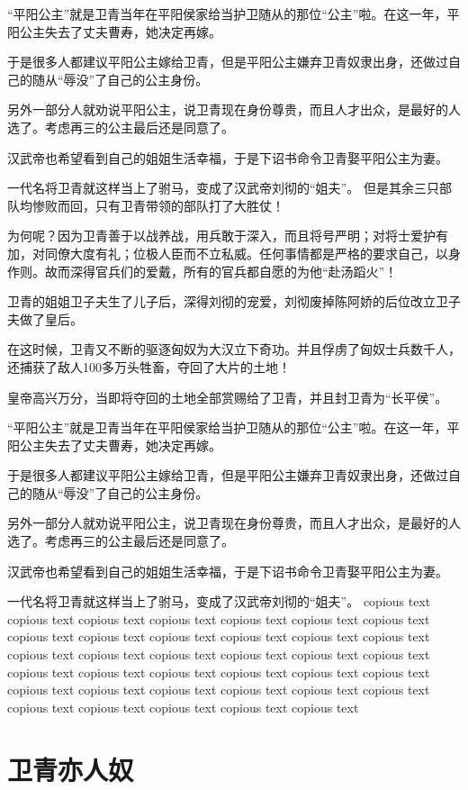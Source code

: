 \documentclass[UTF8,cap,nofonts,openany,twoside]{ctexbook}
\begin{document}
“平阳公主”就是卫青当年在平阳侯家给当护卫随从的那位“公主”啦。在这一年，平阳公主失去了丈夫曹寿，她决定再嫁。

于是很多人都建议平阳公主嫁给卫青，但是平阳公主嫌弃卫青奴隶出身，还做过自己的随从“辱没”了自己的公主身份。

另外一部分人就劝说平阳公主，说卫青现在身份尊贵，而且人才出众，是最好的人选了。考虑再三的公主最后还是同意了。

汉武帝也希望看到自己的姐姐生活幸福，于是下诏书命令卫青娶平阳公主为妻。

一代名将卫青就这样当上了驸马，变成了汉武帝刘彻的“姐夫”。
\newpage
但是其余三只部队均惨败而回，只有卫青带领的部队打了大胜仗！

为何呢？因为卫青善于以战养战，用兵敢于深入，而且将号严明；对将士爱护有加，对同僚大度有礼；位极人臣而不立私威。任何事情都是严格的要求自己，以身作则。故而深得官兵们的爱戴，所有的官兵都自愿的为他“赴汤蹈火”！

卫青的姐姐卫子夫生了儿子后，深得刘彻的宠爱，刘彻废掉陈阿娇的后位改立卫子夫做了皇后。

在这时候，卫青又不断的驱逐匈奴为大汉立下奇功。并且俘虏了匈奴士兵数千人，还捕获了敌人100多万头牲畜，夺回了大片的土地！

皇帝高兴万分，当即将夺回的土地全部赏赐给了卫青，并且封卫青为“长平侯”。

“平阳公主”就是卫青当年在平阳侯家给当护卫随从的那位“公主”啦。在这一年，平阳公主失去了丈夫曹寿，她决定再嫁。

于是很多人都建议平阳公主嫁给卫青，但是平阳公主嫌弃卫青奴隶出身，还做过自己的随从“辱没”了自己的公主身份。

另外一部分人就劝说平阳公主，说卫青现在身份尊贵，而且人才出众，是最好的人选了。考虑再三的公主最后还是同意了。

汉武帝也希望看到自己的姐姐生活幸福，于是下诏书命令卫青娶平阳公主为妻。

一代名将卫青就这样当上了驸马，变成了汉武帝刘彻的“姐夫”。
\setcounter{page}{10}
\noindent copious text copious text copious text copious text copious text copious text copious text copious text copious text copious text copious text copious text copious text copious text copious text copious text copious text copious text copious text copious text copious text copious text copious text copious text copious text copious text copious text copious text copious text copious text copious text copious text copious text copious text copious text copious text

\chapter{卫青亦人奴}
\end{document}
